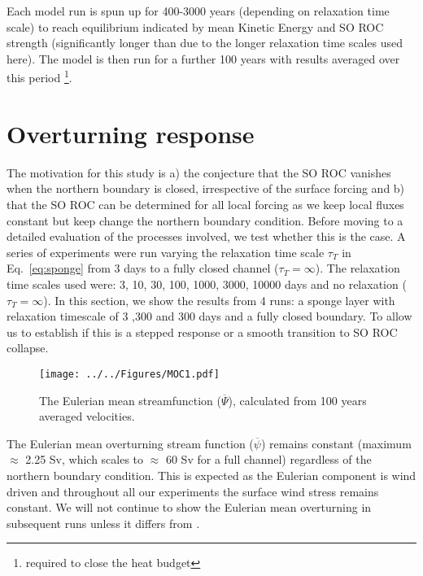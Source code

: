 Each model run is spun up for 400-3000 years (depending on relaxation time scale) to reach equilibrium indicated by mean Kinetic Energy and SO ROC strength (significantly longer than \citet{Abernathey2011} due to the longer relaxation time scales used here). The model is then run for a further 100 years with results averaged over this period \footnote{required to close the heat budget}.

\section{Overturning response}

The motivation for this study is a) the conjecture that the SO ROC vanishes when the northern boundary is closed, irrespective of the surface forcing and b) %
that the SO ROC can be determined for all local forcing
as we keep local fluxes constant but keep change the northern boundary condition. Before moving to a detailed evaluation of the processes involved, we test whether this is the case. A series of experiments were run varying the relaxation time scale $\tau_T$ in Eq.~\ref{eq:sponge} from 3 days to a fully closed channel ($\tau_T = \infty$). The relaxation time scales used were: 3, 10, 30, 100, 1000, 3000, 10000 days and no relaxation ($\tau_T = \infty$). In this section, we show the results from 4 runs: a sponge layer with relaxation timescale of 3 ,300 and 300 days and a fully closed boundary. To allow us to establish if this is a stepped response or a smooth transition to SO ROC collapse.

\begin{figure}[H]
\noindent \texttt{[image: ../../Figures/MOC1.pdf]}
\caption{The Eulerian mean streamfunction ($\overline{\Psi}$), calculated from 100 years averaged velocities. }
\label{fig:MOC}
\end{figure}

The Eulerian mean overturning stream function ($\overline{\psi}$) remains constant  (maximum $\approx$ 2.25 Sv, which scales to $\approx$ 60 Sv for a full channel) regardless of the northern boundary condition. This is expected as the Eulerian component is wind driven and throughout all our experiments the surface wind stress remains constant. We will not continue to show the Eulerian mean overturning in subsequent runs unless it differs from .

